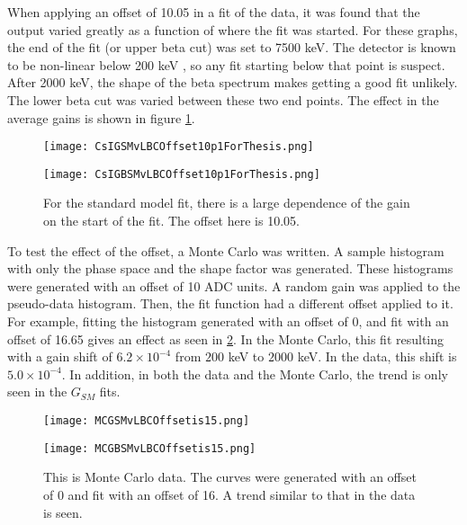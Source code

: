 \documentclass[../MaxHughesThesis.tex]{subfiles}
\begin{document}
When applying an offset of 10.05 in a fit of the data, it was found that the output varied greatly as a function of where the fit was started.
For these graphs, the end of the fit (or upper beta cut) was set to 7500 keV.
The detector is known to be non-linear below 200 keV \cite{Kno10}, so any fit starting below that point is suspect. 
After 2000 keV, the shape of the beta spectrum makes getting a good fit unlikely.
The lower beta cut was varied between these two end points.
The effect in the average gains is shown in figure \ref{fig:offset10LBCeffect}.

\begin{figure}
    \centering
    \begin{minipage}{0.50\textwidth}
        \centerline{\texttt{[image: CsIGSMvLBCOffset10p1ForThesis.png]}}
    \end{minipage}\hfill
    \begin{minipage}{0.50\textwidth}
        \centerline{\texttt{[image: CsIGBSMvLBCOffset10p1ForThesis.png]}}
    \end{minipage}
    \caption{For the standard model fit, there is a large dependence of the gain on the start of the fit.
	     The offset here is 10.05.}
    \label{fig:offset10LBCeffect}
\end{figure}

To test the effect of the offset, a Monte Carlo was written.
A sample histogram with only the phase space and the shape factor was generated. 
These histograms were generated with an offset of 10 ADC units.
A random gain was applied to the pseudo-data histogram. 
Then, the fit function had a different offset applied to it.
For example, fitting the histogram generated with an offset of 0, and fit with an offset of 16.65 gives an effect as seen in \ref{fig:MCoffset10applied20}.
In the Monte Carlo, this fit resulting with a gain shift of $6.2 \times 10^{-4}$ from $200$ keV to $2000$ keV.
In the data, this shift is $5.0 \times 10^{-4}$. 
In addition, in both the data and the Monte Carlo, the trend is only seen in the $G_{SM}$ fits.

\begin{figure}
	\centering
	\begin{minipage}{0.50\textwidth}
		\centerline{\texttt{[image: MCGSMvLBCOffsetis15.png]}}
	\end{minipage}\hfill
	\begin{minipage}{0.50\textwidth}
		\centerline{\texttt{[image: MCGBSMvLBCOffsetis15.png]}}
	\end{minipage}
	\caption{This is Monte Carlo data.
		 The curves were generated with an offset of 0 and fit with an offset of 16.
		 A trend similar to that in the data is seen.}
	\label{fig:MCoffset10applied20}
\end{figure}
\end{document}
